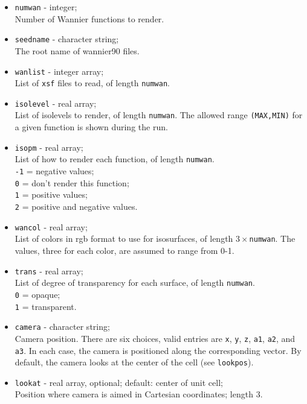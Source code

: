 \documentclass[
  notitlepage,
  twoside,
   prb,
  floatfix,
]{revtex4-1}
\begin{document}
\begin{itemize}
\item
{\tt numwan} - integer; \\   
Number of Wannier functions to render.

\item
{\tt seedname} - character string; \\
The root name of \textsf{wannier90} files.

\item
{\tt wanlist}  - integer array; \\
List of {\tt xsf} files to read, of length {\tt numwan}.

\item
{\tt isolevel} - real array; \\ 
List of isolevels to render, of length {\tt numwan}. The allowed range {\tt (MAX,MIN)}
for a given function is shown during the run.

\item
{\tt isopm} - real array; \\
List of how to render each function, of length {\tt numwan}. \\
{\tt -1} = negative values; \\
{\tt  0} = don't render this function; \\
{\tt 1} = positive values; \\
{\tt 2} = positive and negative values.

\item
{\tt wancol} - real array; \\
 List of colors in rgb format to use for isosurfaces, of length $3\times${\tt numwan}. The values, three for each color, are assumed to range from 0-1.

\item 
{\tt trans} - real array;\\
 List of degree of transparency for each surface, of length {\tt numwan}. \\
{\tt 0} = opaque; \\
{\tt 1} = transparent.

\item 
{\tt camera} - character string; \\
Camera position. There are six choices, valid entries are {\tt x}, {\tt y}, {\tt z}, 
{\tt a1}, {\tt a2}, and {\tt a3}. In each case, the camera is positioned along the corresponding vector. By default, the camera looks at the center of the cell (see {\tt lookpos}).

\item
{\tt lookat} - real array, optional; default: center of unit cell; \\
Position where camera is aimed in Cartesian coordinates; length 3.


\end{itemize}
\end{document}
